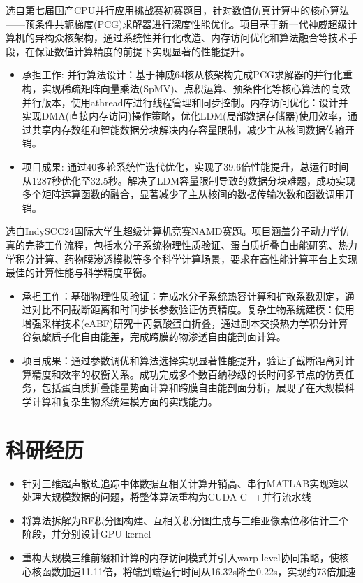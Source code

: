 \documentclass{resume}
\begin{document}
选自第七届国产CPU并行应用挑战赛初赛题目，针对数值仿真计算中的核心算法——预条件共轭梯度(PCG)求解器进行深度性能优化。项目基于新一代神威超级计算机的异构众核架构，通过系统性并行化改造、内存访问优化和算法融合等技术手段，在保证数值计算精度的前提下实现显著的性能提升。
\begin{itemize}
  \item 承担工作: 并行算法设计：基于神威64核从核架构完成PCG求解器的并行化重构，实现稀疏矩阵向量乘法(SpMV)、点积运算、预条件化等核心算法的高效并行版本，使用athread库进行线程管理和同步控制。内存访问优化：设计并实现DMA(直接内存访问)操作策略，优化LDM(局部数据存储器)使用效率，通过共享内存数组和智能数据分块解决内存容量限制，减少主从核间数据传输开销。
  \item 项目成果: 通过40多轮系统性迭代优化，实现了39.6倍性能提升，总运行时间从1287秒优化至32.5秒。解决了LDM容量限制导致的数据分块难题，成功实现多个矩阵运算函数的融合，显著减少了主从核间的数据传输次数和函数调用开销。
\end{itemize}

选自IndySCC24国际大学生超级计算机竞赛NAMD赛题。项目涵盖分子动力学仿真的完整工作流程，包括水分子系统物理性质验证、蛋白质折叠自由能研究、热力学积分计算、药物膜渗透模拟等多个科学计算场景，要求在高性能计算平台上实现最佳的计算性能与科学精度平衡。
\begin{itemize}
  \item 承担工作：基础物理性质验证：完成水分子系统热容计算和扩散系数测定，通过对比不同截断距离和时间步长参数验证仿真精度。复杂生物系统建模：使用增强采样技术(eABF)研究十丙氨酸蛋白折叠，通过副本交换热力学积分计算谷氨酸质子化自由能差，完成跨膜药物渗透自由能剖面计算。
  \item 项目成果：通过参数调优和算法选择实现显著性能提升，验证了截断距离对计算精度和效率的权衡关系。成功完成多个数百纳秒级的长时间多节点的仿真任务，包括蛋白质折叠能量势面计算和跨膜自由能剖面分析，展现了在大规模科学计算和复杂生物系统建模方面的实践能力。
\end{itemize}



\section{科研经历}
\begin{itemize}
  \item 针对三维超声散斑追踪中体数据互相关计算开销高、串行MATLAB实现难以处理大规模数据的问题，将整体算法重构为CUDA C++并行流水线
  \item 将算法拆解为RF积分图构建、互相关积分图生成与三维亚像素位移估计三个阶段，并分别设计GPU kernel
  \item 重构大规模三维前缀和计算的内存访问模式并引入warp-level协同策略，使核心核函数加速11.11倍，将端到端运行时间从16.32s降至0.22s，实现约73倍加速
\end{itemize}
\end{document}
